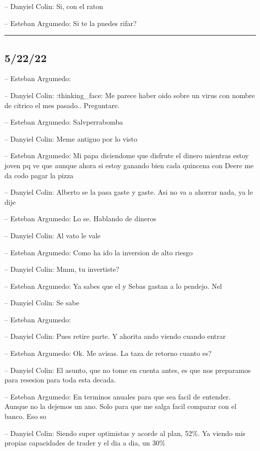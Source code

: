 -- Danyiel Colin: Si, con el raton

-- Esteban Argumedo: Si te la puedes rifar?

\begin{center}\rule{0.5\linewidth}{0.5pt}\end{center}

\hypertarget{section-83}{%
\subsection{5/22/22}\label{section-83}}

-- Esteban Argumedo:

-- Danyiel Colin: :thinking\_face: Me parece haber oido sobre un virus
con nombre de citrico el mes pasado.. Preguntare.

-- Esteban Argumedo: Salvperrabomba

-- Danyiel Colin: Meme antiguo por lo visto

-- Esteban Argumedo: Mi papa diciendome que disfrute el dinero mientras
estoy joven pq ve que aunque ahora si estoy ganando bien cada quincena
con Deere me da codo pagar la pizza

-- Danyiel Colin: Alberto se la pasa gaste y gaste. Asi no va a ahorrar
nada, ya le dije

-- Esteban Argumedo: Lo se. Hablando de dineros

-- Danyiel Colin: Al vato le vale

-- Esteban Argumedo: Como ha ido la inversion de alto riesgo

-- Danyiel Colin: Mmm, tu invertiste?

-- Esteban Argumedo: Ya sabes que el y Sebas gastan a lo pendejo. Nel

-- Danyiel Colin: Se sabe

-- Esteban Argumedo:

-- Danyiel Colin: Pues retire parte. Y ahorita ando viendo cuando entrar

-- Esteban Argumedo: Ok. Me avisas. La taza de retorno cuanto es?

-- Danyiel Colin: El asunto, que no tome en cuenta antes, es que nos
preparamos para resesion para toda esta decada.

-- Esteban Argumedo: En terminos anuales para que sea facil de entender.
Aunque no la dejemos un ano. Solo para que me salga facil comparar con
el banco. Eso so

-- Danyiel Colin: Siendo super optimistas y acorde al plan, 52\%. Ya
viendo mis propias capacidades de trader y el dia a dia, un 30\%

